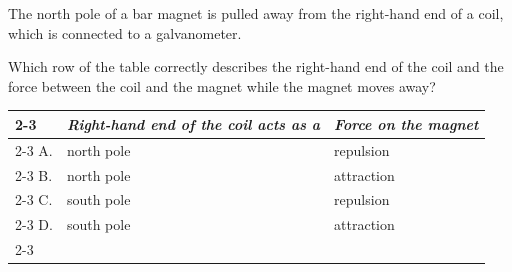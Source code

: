 \begin{quizq}{}
The north pole of a bar magnet is pulled away from the right-hand end of a coil, which is connected to
a galvanometer.
\begin{center}
\end{center}
Which row of the table correctly describes the right-hand end of the coil and the force between the
coil and the magnet while the magnet moves away?
\begin{center}
  \renewcommand\arraystretch{1.7}
  \begin{tabular}{@{}p{10mm}|>{\centering\arraybackslash}p{56mm}|>{\centering\arraybackslash}p{44mm}|}
    \cline{2-3}
    & \textit{Right-hand end of the coil acts as a} & \textit{Force on the magnet}\\ \cline{2-3}
    A. & north pole & repulsion\\ \cline{2-3}
    B. & north pole & attraction\\ \cline{2-3}
    C. & south pole & repulsion\\ \cline{2-3}
    D. & south pole & attraction\\ \cline{2-3}
  \end{tabular}
\end{center}
\end{quizq}

